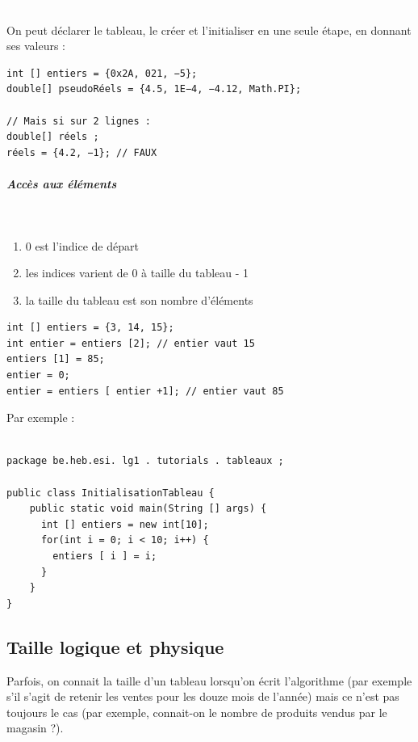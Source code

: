 \documentclass[11pt,a4paper]{article}
\begin{document}
					\textcolor{white}{.} \par
				
        On peut d\'eclarer le tableau, le cr\'eer et l'initialiser en une seule \'etape, en donnant ses valeurs :
      
            \par
        \begin{verbatim}
int [] entiers = {0x2A, 021, −5};
double[] pseudoRéels = {4.5, 1E−4, −4.12, Math.PI};

// Mais si sur 2 lignes :
double[] réels ;
réels = {4.2, −1}; // FAUX
      \end{verbatim}
			
		\subparagraph{Acc\`es aux \'el\'ements} 
		
					\textcolor{white}{.} \par
				
					\begin{enumerate}
				
			\item 0 est l'indice de d\'epart
			\item les indices varient de 0 \`a taille du tableau - 1
			\item la taille du tableau est son nombre d'\'el\'ements
					\end{enumerate}
				
            \par
        \begin{verbatim}
int [] entiers = {3, 14, 15};
int entier = entiers [2]; // entier vaut 15
entiers [1] = 85;
entier = 0;
entier = entiers [ entier +1]; // entier vaut 85
      \end{verbatim}Par exemple :
            \par
        \begin{verbatim}

package be.heb.esi. lg1 . tutorials . tableaux ;

public class InitialisationTableau {
    public static void main(String [] args) {
      int [] entiers = new int[10];
      for(int i = 0; i < 10; i++) {
        entiers [ i ] = i;
      }
    }
}\end{verbatim}\subsection{Taille logique et physique}
		    Parfois, on connait la taille d'un tableau lorsqu'on \'ecrit l'algorithme (par exemple s'il s'agit
        de retenir les ventes pour les douze mois de l'ann\'ee) mais ce n'est pas toujours le cas (par
        exemple, connait-on le nombre de produits vendus par le magasin ?).
		  
\end{document}
